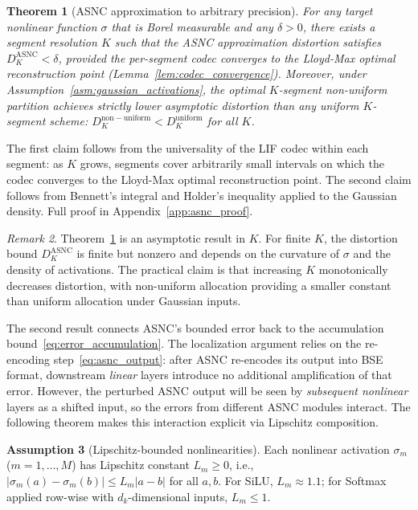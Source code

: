 \documentclass{article}
\theoremstyle{plain}
\newtheorem{theorem}{Theorem}[section]
\theoremstyle{definition}
\newtheorem{assumption}[theorem]{Assumption}
\theoremstyle{remark}
\newtheorem{remark}[theorem]{Remark}
\begin{document}
\begin{theorem}[ASNC approximation to arbitrary precision]
\label{thm:asnc_bound}
For any target nonlinear function $\sigma$ that is Borel measurable and any $\delta > 0$,
there exists a segment resolution $K$ such that the ASNC approximation distortion
satisfies $D_K^{\mathrm{ASNC}} < \delta$, provided the per-segment codec converges
to the Lloyd-Max optimal reconstruction point (Lemma~\ref{lem:codec_convergence}).
Moreover, under Assumption~\ref{asm:gaussian_activations}, the optimal $K$-segment
non-uniform partition achieves strictly lower asymptotic distortion than any uniform
$K$-segment scheme: $D_K^{\mathrm{non-uniform}} < D_K^{\mathrm{uniform}}$ for all $K$.
\end{theorem}
The first claim follows from the universality of the LIF codec within each segment:
as $K$ grows, segments cover arbitrarily small intervals on which the codec converges
to the Lloyd-Max optimal reconstruction point. The second claim follows from
Bennett's integral and Holder's inequality applied to the Gaussian density. Full
proof in Appendix~\ref{app:asnc_proof}.

\begin{remark}
Theorem~\ref{thm:asnc_bound} is an asymptotic result in $K$. For finite $K$, the
distortion bound $D_K^{\mathrm{ASNC}}$ is finite but nonzero and depends on the
curvature of $\sigma$ and the density of activations. The practical claim is that
increasing $K$ monotonically decreases distortion, with non-uniform allocation
providing a smaller constant than uniform allocation under Gaussian inputs.
\end{remark}

The second result connects ASNC's bounded error back to the accumulation
bound~\eqref{eq:error_accumulation}. The localization argument relies on the
re-encoding step~\eqref{eq:asnc_output}: after ASNC re-encodes its output into BSE
format, downstream \emph{linear} layers introduce no additional amplification of that
error. However, the perturbed ASNC output will be seen by \emph{subsequent nonlinear}
layers as a shifted input, so the errors from different ASNC modules interact. The
following theorem makes this interaction explicit via Lipschitz composition.

\begin{assumption}[Lipschitz-bounded nonlinearities]
\label{asm:lipschitz}
Each nonlinear activation $\sigma_m$ ($m = 1,\ldots,M$) has Lipschitz constant
$L_m \ge 0$, i.e., $|\sigma_m(a) - \sigma_m(b)| \le L_m|a - b|$ for all $a,b$.
For SiLU, $L_m \approx 1.1$; for Softmax applied row-wise with $d_k$-dimensional
inputs, $L_m \le 1$.
\end{assumption}
\end{document}
